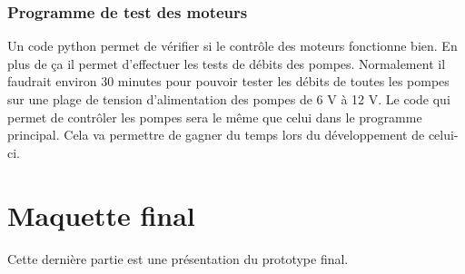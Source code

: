 \documentclass[a4paper, 11pt]{article}
\begin{document}
\subsubsection{Programme de test des moteurs}
Un code python permet de vérifier si le contrôle des moteurs fonctionne bien.
En plus de ça il permet d'effectuer les tests de débits des pompes.
Normalement il faudrait environ 30 minutes pour pouvoir tester les débits de toutes les pompes sur une plage de tension d'alimentation des pompes de 6 V à 12 V.
Le code qui permet de contrôler les pompes sera le même que celui dans le programme principal.
Cela va permettre de gagner du temps lors du développement de celui-ci.
\newpage
\section{Maquette final}
Cette dernière partie est une présentation du prototype final.
\end{document}
